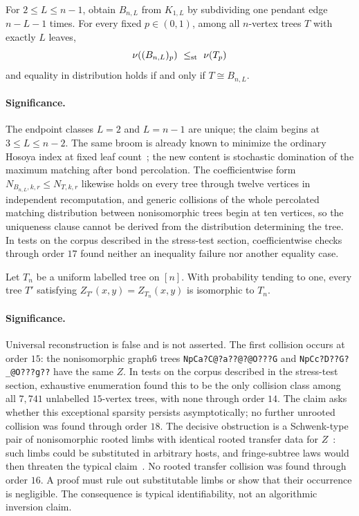 \begin{conjecture}\label{as9}
For $2\le L\le n-1$, obtain $B_{n,L}$ from $K_{1,L}$ by subdividing one
pendant edge $n-L-1$ times.  For every fixed $p\in(0,1)$, among all
$n$-vertex trees $T$ with exactly $L$ leaves,
\[
 \nu((B_{n,L})_p)\ \le_{\rm st}\ \nu(T_p)
\]
and equality in distribution holds if and only if $T\cong B_{n,L}$.
\end{conjecture}

\paragraph{Significance.}
The endpoint classes $L=2$ and $L=n-1$ are unique; the claim begins at
$3\le L\le n-2$.  The same broom is already known to minimize the ordinary
Hosoya index at fixed leaf count~\cite{PanXuYangZhou07,YuLv07}; the new content
is stochastic domination of the maximum matching after bond percolation.
The coefficientwise form $N_{B_{n,L},k,r}\le N_{T,k,r}$ likewise holds on every tree through twelve vertices in independent recomputation, and generic collisions of the whole percolated matching distribution between nonisomorphic trees begin at ten vertices, so the uniqueness clause cannot be derived from the distribution determining the tree.  In tests on the corpus described in the stress-test section,
coefficientwise checks through order $17$ found neither an inequality
failure nor another equality case.

\begin{conjecture}\label{as10}
Let $T_n$ be a uniform labelled tree on $[n]$.  With probability tending to
one, every tree $T'$ satisfying $Z_{T'}(x,y)=Z_{T_n}(x,y)$ is isomorphic to
$T_n$.
\end{conjecture}

\paragraph{Significance.}
Universal reconstruction is false and is not asserted.  The first collision
occurs at order $15$: the nonisomorphic graph6 trees
\texttt{NpCa?C@?a??@?@O???G} and
\texttt{NpCc?D??G?\_@O???g??} have the same $Z$.  In tests on the corpus described in the stress-test section, exhaustive
enumeration found this to be the only collision class among all $7{,}741$
unlabelled $15$-vertex trees, with none through order $14$.  The claim asks whether this
exceptional sparsity persists asymptotically; no further unrooted collision was
found through order $18$.  The decisive obstruction is a
Schwenk-type pair of nonisomorphic rooted limbs with identical rooted transfer
data for $Z$~\cite{Schwenk73}: such limbs could be substituted in arbitrary
hosts, and fringe-subtree laws would then threaten the typical
claim~\cite{Janson16}.  No rooted transfer collision was
found through order $16$.  A proof must rule out
substitutable limbs or show that their occurrence is negligible.  The
consequence is typical identifiability, not an algorithmic inversion claim.

